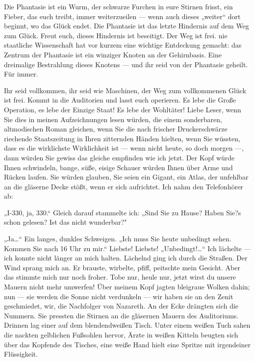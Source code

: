 Die Phantasie ist ein Wurm, der schwarze Furchen in eure Stirnen
frisst, ein Fieber, das euch treibt, immer weiterzueilen — wenn
auch dieses „weiter“ dort beginnt, wo das Glück endet. Die
Phantasie ist das letzte Hindernis auf dem Weg zum Glück. Freut
euch, dieses Hindernis ist beseitigt. Der Weg ist frei.
nie staatliche Wissenschaft hat vor kurzem eine wichtige Entdeckung
gemacht: das Zentrum der Phantasie ist ein winziger Knoten an der
Gehirnbasis. Eine dreimalige Bestrahlung dieses Knotens — und ihr
seid von der Phantasie geheilt. Für immer.

Ihr seid vollkommen, ihr seid wie Maschinen, der Weg zum
vollkommenen Glück ist frei. Kommt in die Auditorien und lasst euch
operieren. Es lebe die Große Operation, es lebe der Einzige Staat!
Es lebe der Wohltäter! Liebe Leser, wenn Sie dies in meinen
Aufzeichnungen lesen würden, die einem sonderbaren, altmodischen
Roman gleichen, wenn Sie die nach frischer Druckerschwärze
riechende Staatszeitung in Ihren zitternden Händen hielten, wenn
Sie wüssten, dass es die wirklichste Wirklichkeit ist — wenn nicht
heute, so doch morgen —, dann würden Sie gewiss das gleiche
empfinden wie ich jetzt. Der Kopf würde Ihnen schwindeln, bange,
süße, eisige Schauer würden Ihnen über Arme und Rücken laufen. Sie
würden glauben, Sie seien ein Gigant, ein Atlas, der unfehlbar an
die gläserne Decke stößt, wenn er sich aufrichtet. Ich nahm den
Telefonhörer ab:

„I-330, ja, 330.“ Gleich darauf stammelte ich: „Sind Sie zu Hause?
Haben Sie?s schon gelesen? Ist das nicht wunderbar?"

„Ja\ldots{}“ Ein langes, dunkles Schweigen. „Ich muss Sie heute
unbedingt sehen. Kommen Sie nach 16 Uhr zu mir.“ Liebste! Liebste!
„Unbedingt!\ldots{}“ Ich lächelte — ich konnte nicht länger an mich
halten. Lächelnd ging ich durch die Straßen. Der Wind sprang mich
an. Er brauste, wirbelte, pfiff, peitschte mein Gesicht. Aber das
stimmte mich nur noch froher. Tobe nur, heule nur, jetzt wirst du
unsere Mauern nicht mehr umwerfen! Über meinem Kopf jagten
bleigraue Wolken dahin; nun — sie werden
die Sonne nicht verdunkeln — wir haben sie an den Zenit
geschmiedet, wir, die Nachfolger von Nazareth. An der Ecke drängten
sich die Nummern. Sie pressten die Stirnen an die gläsernen Mauern
des Auditoriums. Drinnen lag einer auf dem blendendweißen Tisch.
Unter einem weißen Tuch sahen die nackten gelblichen Fußsohlen
hervor, Ärzte in weißen Kitteln beugten sich über das Kopfende des
Tisches, eine weiße Hand hielt eine Spritze mit irgendeiner
Flüssigkeit.

